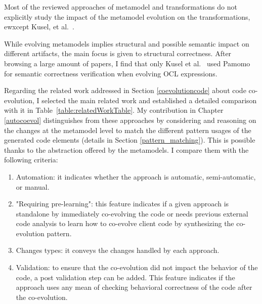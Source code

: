  
  Most of the reviewed approaches of metamodel and transformations do not explicitly study the impact of the metamodel evolution on the transformations, ewxcept Kusel, et al.~\cite{kusel2015consistent}.
  
  While evolving metamodels implies structural and possible semantic impact on different artifacts, the main focus is given to structural correctness. After browsing a large amount of papers, I find that only Kusel et al.~\cite{kusel2015systematic} used Pamomo~\cite{10.1007/s10515-012-0102-y} for semantic correctness verification when evolving OCL expressions.
  
  Regarding the related work addressed in Section \ref{coevolutioncode} about code co-evolution, I selected the main related work and established a detailed comparison with it in Table~\ref{table:relatedWorkTable}. My contribution in Chapter \ref{autocoevol} distinguishes from these approaches by considering and reasoning on the changes at the metamodel level to match the different pattern usages of the generated code elements (details in Section \ref{pattern_matching}). This is possible thanks to the abstraction offered by the metamodels. 
  I compare them with the following criteria: %
  
  \begin{enumerate}
  	
  	\item Automation: it indicates whether the approach is automatic, semi-automatic, or manual.
  	\item "Requiring pre-learning": 
  	this feature indicates if a given approach is standalone by immediately co-evolving the code or needs previous external code analysis to learn how to co-evolve client code by synthesizing the co-evolution pattern.
  	\item Changes types: it conveys the changes handled by each approach.
  	\item Validation: to ensure that the co-evolution did not impact the behavior of the code, a post validation step can be added. This feature indicates if the approach uses any mean of checking behavioral correctness of the code after the co-evolution.
  
  \end{enumerate}
  
